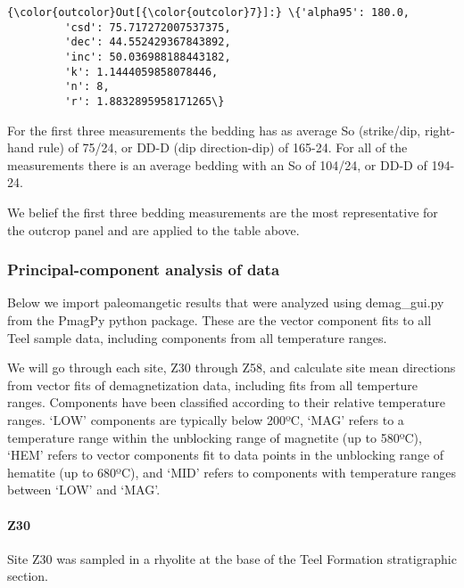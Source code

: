 \documentclass[11pt]{article}
\begin{document}
            \begin{Verbatim}[commandchars=\\\{\}]
{\color{outcolor}Out[{\color{outcolor}7}]:} \{'alpha95': 180.0,
         'csd': 75.717272007537375,
         'dec': 44.552429367843892,
         'inc': 50.036988188443182,
         'k': 1.1444059858078446,
         'n': 8,
         'r': 1.8832895958171265\}
\end{Verbatim}
        
    For the first three measurements the bedding has as average So
(strike/dip, right-hand rule) of 75/24, or DD-D (dip direction-dip) of
165-24. For all of the measurements there is an average bedding with an
So of 104/24, or DD-D of 194-24.

We belief the first three bedding measurements are the most
representative for the outcrop panel and are applied to the table above.

    \subsubsection{Principal-component analysis of
data}\label{principal-component-analysis-of-data}

    Below we import paleomangetic results that were analyzed using
demag\_gui.py from the PmagPy python package. These are the vector
component fits to all Teel sample data, including components from all
temperature ranges.


    We will go through each site, Z30 through Z58, and calculate site mean
directions from vector fits of demagnetization data, including fits from
all temperture ranges. Components have been classified according to
their relative temperature ranges. `LOW' components are typically below
200ºC, `MAG' refers to a temperature range within the unblocking range
of magnetite (up to 580ºC), `HEM' refers to vector components fit to
data points in the unblocking range of hematite (up to 680ºC), and `MID'
refers to components with temperature ranges between `LOW' and `MAG'.

    \paragraph{Z30}\label{z30}

    Site Z30 was sampled in a rhyolite at the base of the Teel Formation
stratigraphic section.



    \begin{center}
    \end{center}
    { \hspace*{\fill} \\}
    
\end{document}
